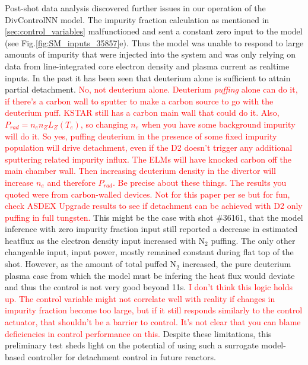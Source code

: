 Post-shot data analysis discovered further issues in our operation of the DivControlNN model.
The impurity fraction calculation as mentioned in \ref{sec:control_variables} malfunctioned and sent a constant zero input to the model (see Fig.\ref{fig:SM_inputs_35857}e).
Thus the model was unable to respond to large amounts of impurity that were injected into the system and was only relying on data from line-integrated core electron density and plasma current as realtime inputs.
In the past it has been seen that deuterium alone is sufficient to attain partial detachment\cite{Loarte_1998_NF, Eldon_2017_NF}.
\textcolor{red}{No, not deuterium alone. Deuterium \emph{puffing} alone can do it, if there's a carbon wall to sputter to make a carbon source to go with the deuterium puff. KSTAR still has a carbon main wall that could do it. Also, $P_{rad}=n_e n_Z L_Z(T_e)$, so changing $n_e$ when you have some background impurity will do it. So yes, puffing deuterium in the presence of some fixed impurity population will drive detachment, even if the D2 doesn't trigger any additional sputtering related impurity influx. The ELMs will have knocked carbon off the main chamber wall. Then increasing deuterium density in the divertor will increase $n_e$ and therefore $P_{rad}$. Be precise about these things. The results you quoted were from carbon-walled devices. Not for this paper per se but for fun, check ASDEX Upgrade results to see if detachment can be achieved with D2 only puffing in full tungsten.}
This might be the case with shot \#36161, that the model inference with zero impurity fraction input still reported a decrease in estimated heatflux as the electron density input increased with N$_2$ puffing.
The only other changeable input, input power, mostly remained constant during flat top of the shot.
However, as the amount of total puffed N$_2$ increased, the pure deuterium plasma case from which the model must be infering the heat flux would deviate and thus the control is not very good beyond 11s.
\textcolor{red}{I don't think this logic holds up. The control variable might not correlate well with reality if changes in impurity fraction become too large, but if it still responds similarly to the control actuator, that shouldn't be a barrier to control. It's not clear that you can blame deficiencies in control performance on this.}
Despite these limitations, this preliminary test sheds light on the potential of using such a surrogate model-based controller for detachment control in future reactors.
